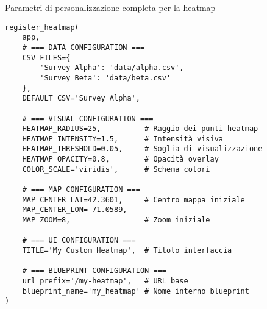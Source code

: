 \begin{listing}[H]
\caption{Parametri di personalizzazione completa per la heatmap}
\label{lst:full_customization_params}
\begin{verbatim}
register_heatmap(
    app,
    # === DATA CONFIGURATION ===
    CSV_FILES={
        'Survey Alpha': 'data/alpha.csv',
        'Survey Beta': 'data/beta.csv'
    },
    DEFAULT_CSV='Survey Alpha',
    
    # === VISUAL CONFIGURATION ===
    HEATMAP_RADIUS=25,          # Raggio dei punti heatmap
    HEATMAP_INTENSITY=1.5,      # Intensità visiva
    HEATMAP_THRESHOLD=0.05,     # Soglia di visualizzazione
    HEATMAP_OPACITY=0.8,        # Opacità overlay
    COLOR_SCALE='viridis',      # Schema colori
    
    # === MAP CONFIGURATION ===
    MAP_CENTER_LAT=42.3601,     # Centro mappa iniziale
    MAP_CENTER_LON=-71.0589,
    MAP_ZOOM=8,                 # Zoom iniziale
    
    # === UI CONFIGURATION ===
    TITLE='My Custom Heatmap',  # Titolo interfaccia
    
    # === BLUEPRINT CONFIGURATION ===
    url_prefix='/my-heatmap',   # URL base
    blueprint_name='my_heatmap' # Nome interno blueprint
)
\end{verbatim}
\end{listing}
